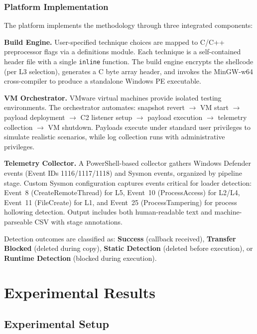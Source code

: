 \documentclass[10pt,a4paper,twocolumn]{article}
\begin{document}
\subsubsection{Platform Implementation}

The platform implements the methodology through three integrated components:

\textbf{Build Engine.}
User-specified technique choices are mapped to C/C++ preprocessor flags via a definitions module.
Each technique is a self-contained header file with a single \texttt{inline} function.
The build engine encrypts the shellcode (per L3 selection), generates a C byte array header, and invokes the MinGW-w64 cross-compiler to produce a standalone Windows PE executable.

\textbf{VM Orchestrator.}
VMware virtual machines provide isolated testing environments.
The orchestrator automates: snapshot revert $\rightarrow$ VM start $\rightarrow$ payload deployment $\rightarrow$ C2 listener setup $\rightarrow$ payload execution $\rightarrow$ telemetry collection $\rightarrow$ VM shutdown.
Payloads execute under standard user privileges to simulate realistic scenarios, while log collection runs with administrative privileges.

\textbf{Telemetry Collector.}
A PowerShell-based collector gathers Windows Defender events (Event IDs 1116/1117/1118) and Sysmon events, organized by pipeline stage.
Custom Sysmon configuration captures events critical for loader detection: Event~8 (CreateRemoteThread) for L5, Event~10 (ProcessAccess) for L2/L4, Event~11 (FileCreate) for L1, and Event~25 (ProcessTampering) for process hollowing detection.
Output includes both human-readable text and machine-parseable CSV with stage annotations.

Detection outcomes are classified as: \textbf{Success} (callback received), \textbf{Transfer Blocked} (deleted during copy), \textbf{Static Detection} (deleted before execution), or \textbf{Runtime Detection} (blocked during execution).

\section{Experimental Results}

\subsection{Experimental Setup}
\end{document}
